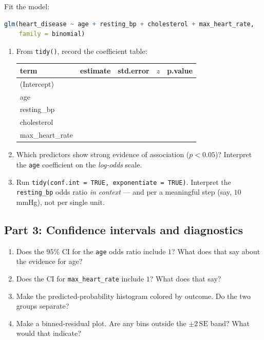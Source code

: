 \documentclass{article}
\begin{document}
Fit the model:
\begin{lstlisting}[language=R]
glm(heart_disease ~ age + resting_bp + cholesterol + max_heart_rate,
    family = binomial)
\end{lstlisting}

\begin{enumerate}[label={\bfseries (\Alph*)},itemsep=.7em]
\item From \texttt{tidy()}, record the coefficient table:
\vspace{0.2em}
\begin{center}
\renewcommand{\arraystretch}{1.3}
\begin{tabular}{lcccc}
\toprule
\textbf{term} & \textbf{estimate} & \textbf{std.error} & \textbf{$z$} & \textbf{p.value} \\
\midrule
(Intercept)    & & & & \\
age            & & & & \\
resting\_bp    & & & & \\
cholesterol    & & & & \\
max\_heart\_rate & & & & \\
\bottomrule
\end{tabular}
\end{center}
\item Which predictors show strong evidence of association ($p < 0.05$)? Interpret the \texttt{age} coefficient on the \emph{log-odds} scale. \\[3.5em]
\item Run \texttt{tidy(conf.int = TRUE, exponentiate = TRUE)}. Interpret the \texttt{resting\_bp} odds ratio \emph{in context} --- and per a meaningful step (say, $10$ mmHg), not per single unit. \\[4em]
\end{enumerate}

\subsection*{Part 3: Confidence intervals and diagnostics}

\begin{enumerate}[label={\bfseries (\Alph*)},itemsep=.7em]
\item Does the $95\%$ CI for the \texttt{age} odds ratio include $1$? What does that say about the evidence for age? \\[3em]
\item Does the CI for \texttt{max\_heart\_rate} include $1$? What does that say? \\[3em]
\item Make the predicted-probability histogram colored by outcome. Do the two groups separate? \\[3em]
\item Make a binned-residual plot. Are any bins outside the $\pm 2\,\mathrm{SE}$ band? What would that indicate? \\[3.5em]
\end{enumerate}
\end{document}
